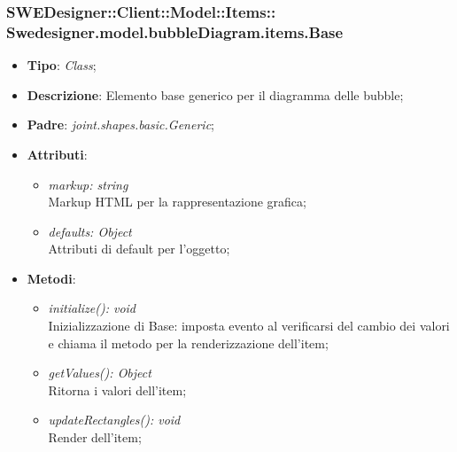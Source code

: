 \documentclass[../DefinizioneDiProdotto.tex]{subfiles}
\begin{document}
			
			\subsubsection[Swedesigner.model.bubbleDiagram.items.Base]{SWEDesigner::Client::Model::Items::\\Swedesigner.model.bubbleDiagram.items.Base}
			\hypertarget{SWEDesigner::Client::Model::Items::Swedesigner.model.bubbleDiagram.items.Base}{}
			\begin{itemize}
				\item \textbf{Tipo}: \emph{Class};
				\item \textbf{Descrizione}: Elemento base generico per il diagramma delle bubble;
				\item \textbf{Padre}: \emph{joint.shapes.basic.Generic};
				\item \textbf{Attributi}:
				\begin{itemize}
					\item \emph{markup: string}\\
					Markup HTML per la rappresentazione grafica;
					\item \emph{defaults: Object}\\
					Attributi di default per l'oggetto;
				\end{itemize}
				\item \textbf{Metodi}:
				\begin{itemize}
					\item \emph{initialize(): void}\\
					Inizializzazione di Base: imposta evento al verificarsi del cambio dei valori e chiama il metodo per la renderizzazione dell'item;
					\item \emph{getValues(): Object}\\
					Ritorna i valori dell'item;
					\item \emph{updateRectangles(): void}\\
					Render dell'item;	
				\end{itemize}
			\end{itemize}
			
\end{document}
